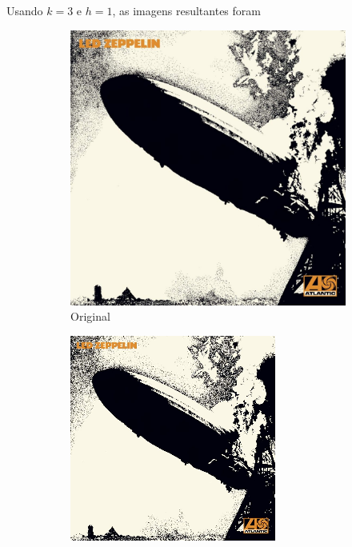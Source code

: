 \documentclass{article}
\begin{document}
Usando $k=3$ e $h=1$, as imagens resultantes foram
\clearpage
\begin{figure}[ht]
  \centering
  \begin{subfigure}{0.48\textwidth}
    \centering
    \includegraphics[width=\textwidth]{imagens-reais/led-zeppelin-1/ledzeppelini.jpg}
    \caption{Original}
  \end{subfigure}%
  \hfill
  \begin{subfigure}{0.48\textwidth}
    \centering
    \includegraphics[width=\textwidth]{imagens-reais/led-zeppelin-1/compressed.png}

\end{subfigure}
\end{figure}
\end{document}

